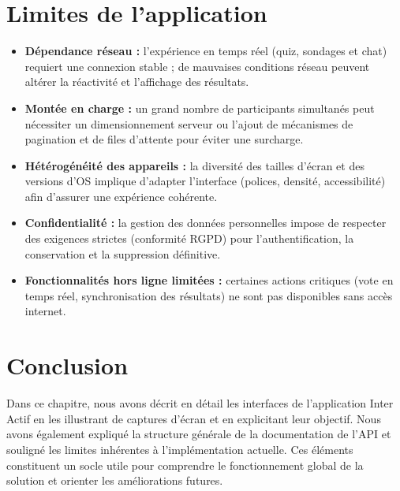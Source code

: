 \section{Limites de l'application}
\begin{itemize}[leftmargin=1.2em]
  \item \textbf{Dépendance réseau :} l'expérience en temps réel (quiz,
    sondages et chat) requiert une connexion stable ; de mauvaises
    conditions réseau peuvent altérer la réactivité et l'affichage des
    résultats.
  \item \textbf{Montée en charge :} un grand nombre de participants
    simultanés peut nécessiter un dimensionnement serveur ou l'ajout de
    mécanismes de pagination et de files d'attente pour éviter une surcharge.
  \item \textbf{Hétérogénéité des appareils :} la diversité des tailles
    d'écran et des versions d'OS implique d'adapter l'interface (polices,
    densité, accessibilité) afin d'assurer une expérience cohérente.
  \item \textbf{Confidentialité :} la gestion des données personnelles
    impose de respecter des exigences strictes (conformité RGPD) pour
    l'authentification, la conservation et la suppression définitive.
  \item \textbf{Fonctionnalités hors ligne limitées :} certaines actions
    critiques (vote en temps réel, synchronisation des résultats) ne sont
    pas disponibles sans accès internet.
\end{itemize}

{}
\section*{Conclusion}
Dans ce chapitre, nous avons décrit en détail les interfaces de
l'application Inter\,Actif en les illustrant de captures d'écran et en
explicitant leur objectif. Nous avons également expliqué la structure
générale de la documentation de l'API et souligné les limites inhérentes
à l'implémentation actuelle. Ces éléments constituent un socle utile pour
comprendre le fonctionnement global de la solution et orienter les
améliorations futures.
